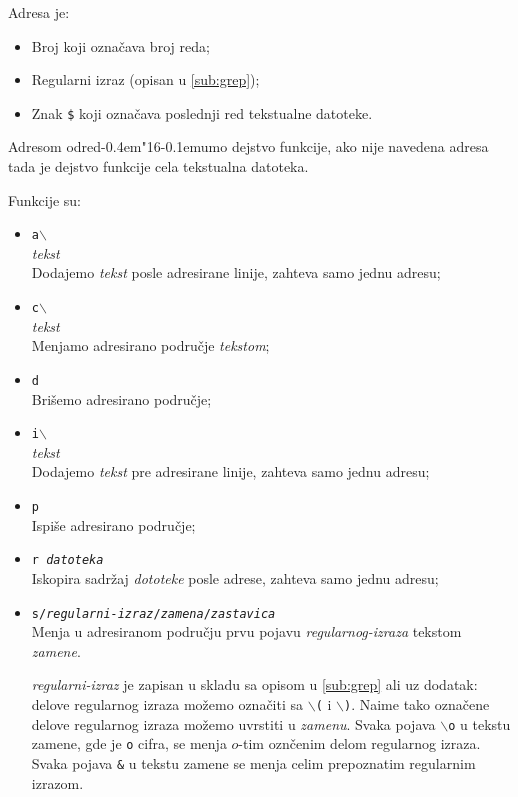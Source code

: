 \documentclass[12pt,a4paper]{article}
\def\d{d\kern-0.4em\char"16\kern-0.1em}
\def\bs{$\backslash$}
\begin{document}
      Adresa je:
      \begin{itemize}
      \item
        Broj koji ozna\v cava broj reda;
      \item
        Regularni izraz (opisan u \ref{sub:grep});
      \item
        Znak {\tt\$} koji ozna\v cava poslednji red tekstualne datoteke.
      \end{itemize}

      Adresom odre\d umo dejstvo funkcije, ako nije navedena adresa tada je
      dejstvo funkcije cela tekstualna datoteka.

      Funkcije su:
      \begin{itemize}
      \item
        {\tt a\bs}\\
        {\it tekst}\\
        Dodajemo {\it tekst} posle adresirane linije, zahteva samo jednu
        adresu;
      \item
        {\tt c\bs}\\
        {\it tekst}\\
        Menjamo adresirano podru\v cje {\it tekstom};
      \item
        {\tt d}\\
        Bri\v semo adresirano podru\v cje;
      \item
        {\tt i\bs}\\
        {\it tekst}\\
        Dodajemo {\it tekst} pre adresirane linije, zahteva samo jednu adresu;
      \item
        {\tt p}\\
        Ispi\v se adresirano podru\v cje;
      \item
        {\tt r {\it datoteka}}\\
        Iskopira sadr\v zaj {\it dototeke} posle adrese, zahteva samo jednu
        adresu;
      \item
        {\tt s/{\it regularni-izraz}/{\it zamena}/{\it zastavica}}\\
        Menja u adresiranom podru\v cju prvu pojavu {\it regularnog-izraza}
        tekstom {\it zamene}.

        {\it regularni-izraz} je zapisan u skladu sa opisom u \ref{sub:grep}
        ali uz dodatak: delove regularnog izraza mo\v zemo ozna\v citi sa
        {\tt\bs(} i {\tt\bs)}.
        Naime tako ozna\v cene delove regularnog izraza mo\v zemo uvrstiti u
        {\it zamenu}.
        Svaka pojava {\tt\bs o} u tekstu zamene, gde je {\tt o} cifra, se
        menja $o$-tim ozn\v cenim delom regularnog izraza.
        Svaka pojava {\tt\&} u tekstu zamene se menja celim prepoznatim
        regularnim izrazom.


\end{itemize}
\end{document}
